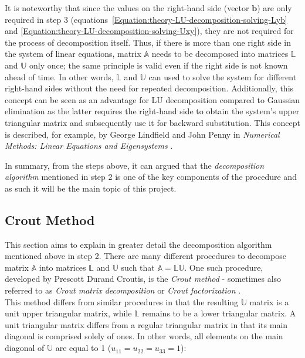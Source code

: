 It is noteworthy that since the values on the right-hand side (vector $ \textbf{b} $) are only required in step 3 (equations~\ref{Equation:theory-LU-decomposition-solving-Lyb} and \ref{Equation:theory-LU-decomposition-solving-Uxy}), they are not required for the process of decomposition itself. Thus, if there is more than one right side in the system of linear equations, matrix $ \mathbb{A} $ needs to be decomposed into matrices $ \mathbb{L} $ and $ \mathbb{U} $ only once; the same principle is valid even if the right side is not known ahead of time. In other words, $ \mathbb{L} $ and $ \mathbb{U} $ can used to solve the system for different right-hand sides without the need for repeated decomposition. Additionally, this concept can be seen as an advantage for LU decomposition compared to Gaussian elimination as the latter requires the right-hand side to obtain the system's upper triangular matrix and subsequently use it for backward substitution. This concept is described, for example, by George Lindfield and John Penny in \emph{Numerical Methods: Linear Equations and Eigensystems} \cite{Lindfield2019}.

In summary, from the steps above, it can argued that the \textit{decomposition algorithm} mentioned in step 2 is one of the key components of the procedure and as such it will be the main topic of this project.

\subsection{Crout Method}\label{Subsection:theory-LU-decomposition-crout-method}
This section aims to explain in greater detail the decomposition algorithm mentioned above in step 2. There are many different procedures to decompose matrix $ \mathbb{A} $ into matrices $ \mathbb{L} $ and $ \mathbb{U} $ such that $ \mathbb{A} = \mathbb{LU} $. One such procedure, developed by Prescott Durand Croutis, is the \textit{Crout method} - sometimes also referred to as \textit{Crout matrix decomposition} or \textit{Crout factorization} \cite{Press2007}. \\
This method differs from similar procedures in that the resulting $ \mathbb{U} $ matrix is a unit upper triangular matrix, while $ \mathbb{L} $ remains to be a lower triangular matrix. A unit triangular matrix differs from a regular triangular matrix in that its main diagonal is comprised solely of ones. In other words, all elements on the main diagonal of $ \mathbb{U} $ are equal to 1 ($ u_{11} = u_{22} = u_{33} = 1 $):

